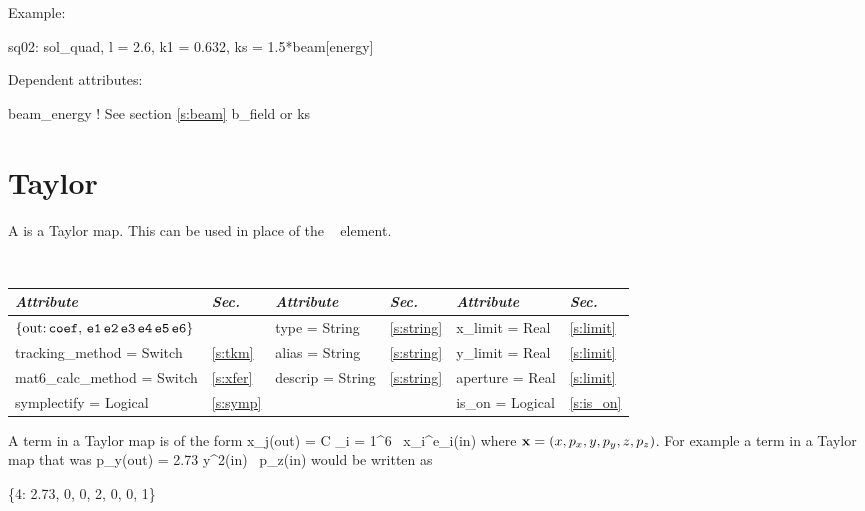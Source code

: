 \vskip0.05in \noindent
Example:
\begin{example}
  sq02: sol_quad, l = 2.6, k1 = 0.632, ks = 1.5*beam[energy]
\end{example}

\vskip0.05in \noindent
Dependent attributes:
\begin{example}
  beam\_energy  ! See section \ref{s:beam}
  b\_field or ks
\end{example}

\section{Taylor}
\label{s:tay}

A  is a Taylor map. This can be used in place of the \mad\ 
 element.

\toffset
\begin{center}
\tt
\begin{tabular}{|l|l||l|l||l|l|} \hline
  {\sl Attribute} & {\sl Sec.}  & {\sl Attribute} & {\sl Sec.} & {\sl Attribute} & {\sl Sec.} \\ \hline
  $\{ \tt \mbox{out:}\,  coef, \, e1 \, e2 \, e3 \, e4 \, e5 \, e6 \}$ 
                                   &              &  type = String       & \ref{s:string} & x\_limit = Real  & \ref{s:limit} \\ \hline  
  tracking\_method = Switch        & \ref{s:tkm}  &  alias = String      & \ref{s:string} & y\_limit = Real  & \ref{s:limit} \\ \hline
  mat6\_calc\_method = Switch      & \ref{s:xfer} &  descrip = String    & \ref{s:string} & aperture = Real  & \ref{s:limit} \\ \hline
  symplectify = Logical            & \ref{s:symp} &                      &                & is\_on = Logical & \ref{s:is_on} \\ \hline
\end{tabular}
\end{center}
\toffset

A term in a Taylor map is of the form
\Begineq
  x_j({\rm out}) = C \cdot \Pi_{i = 1}^6 \, x_i^{e_i}({\rm in})
\Endeq
where ${\bf x} = (x, p_x, y, p_y, z, p_z)$. For example a term
in a Taylor map that was
\Begineq
  p_y({\rm out}) = 2.73 \cdot y^2({\rm in}) \, p_z({\rm in})
\Endeq
would be written as
\begin{example}
  \{4: 2.73, 0, 0, 2, 0, 0, 1\}
\end{example}

